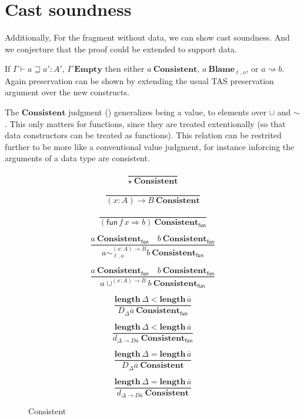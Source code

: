 \section{Cast soundness}

Additionally, For the fragment without data, we can show cast soundness.
And we conjecture that the proof could be extended to support data.
 
If $\varGamma\vdash a\sqsupseteq a':A'$, $\varGamma\ \mathbf{Empty}$ then either $a\ \mathbf{Consistent}$, $a\ \mathbf{Blame}_{\ell,o}$, or $a\rightsquigarrow b$.
Again preservation can be shown by extending the usual \ac{TAS} preservation argument over the new constructs.

The $\mathbf{Consistent}$ judgment () generalizes being a value, to elements over $\cup$ and $\sim$.
This only matters for functions, since they are treated extentionally (so that data constructors can be treated as functions).
This relation can be restrited further to be more like a conventional value judgment, for instance inforcing the arguments of a data type are consistent.

\begin{figure}
\[
\frac{\ }{\star\ \mathbf{Consistent}}
\]

\[
\frac{\ }{\left(x:A\right)\rightarrow B\ \mathbf{Consistent}}
\]

\[
\frac{\ }{\left(\mathsf{fun}\,f\,x\Rightarrow b\right)\ \mathbf{Consistent_{\mathsf{fun}}}}
\]

\[
\frac{
  a\ \mathbf{Consistent_{\mathsf{fun}}}\quad b\ \mathbf{Consistent_{\mathsf{fun}}}
}{
  a\sim_{\ell,o}^{\left(x:A\right)\rightarrow B}b\ \mathbf{Consistent_{\mathsf{fun}}}}
\]

\[
\frac{
  a\ \mathbf{Consistent_{\mathsf{fun}}}\quad b\ \mathbf{Consistent_{\mathsf{fun}}}
}{
  a\cup^{\left(x:A\right)\rightarrow B}b\ \mathbf{Consistent_{\mathsf{fun}}}
}
\]

\[
\frac{
  \mathbf{length}\,\Delta < \mathbf{length}\,\overline{a}
}{
  D_{\Delta}\overline{a}\ \mathbf{Consistent_{\mathsf{fun}}}
}
\]

\[
\frac{
  \mathbf{length}\,\Delta < \mathbf{length}\,\overline{a}
}{
  d_{\Delta\rightarrow D\overline{a}}\ \mathbf{Consistent_{\mathsf{fun}}}
}
\]

\[
\frac{
  \mathbf{length}\,\Delta = \mathbf{length}\,\overline{a}
}{
  D_{\Delta}\overline{a}\ \mathbf{Consistent}
}
\]

\[
\frac{
  \mathbf{length}\,\Delta = \mathbf{length}\,\overline{a}
}{
  d_{\Delta\rightarrow D\overline{a}}\ \mathbf{Consistent}
}
\]

\caption{Consistent}
\label{fig:cast-data-val}
\end{figure}


